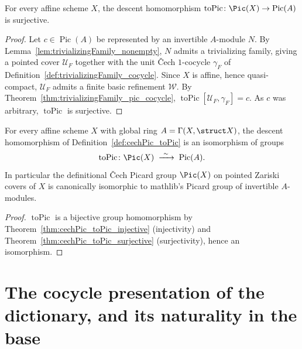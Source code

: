 \begin{theorem}
  \label{thm:cechPic_toPic_surjective}
  \leanok
  For every affine scheme \(X\), the descent homomorphism \(\operatorname{toPic} \colon
  \Pic(X) \to \operatorname{Pic}(A)\) is surjective.
\end{theorem}
\begin{proof}
  \leanok
  Let \(c \in \operatorname{Pic}(A)\) be represented by an invertible \(A\)-module \(N\). By
  Lemma~\ref{lem:trivializingFamily_nonempty}, \(N\) admits a trivializing family, giving a
  pointed cover \(\mathcal U_F\) together with the unit \v Cech \(1\)-cocycle \(\gamma_F\) of
  Definition~\ref{def:trivializingFamily_cocycle}. Since \(X\) is affine, hence quasi-compact,
  \(\mathcal U_F\) admits a finite basic refinement \(\mathcal W\). By
  Theorem~\ref{thm:trivializingFamily_pic_cocycle}, \(\operatorname{toPic}[\mathcal
  U_F,\gamma_F] = c\). As \(c\) was arbitrary, \(\operatorname{toPic}\) is surjective.
\end{proof}

\begin{theorem}
  \label{thm:cechPicEquivPic}
  \leanok
  For every affine scheme \(X\) with global ring \(A = \Gamma(X,\struct X)\), the descent
  homomorphism of Definition~\ref{def:cechPic_toPic} is an isomorphism of groups
  \[
    \operatorname{toPic} \colon \Pic(X) \;\xrightarrow{\ \sim\ }\; \operatorname{Pic}(A).
  \]
  In particular the definitional \v Cech Picard group \(\Pic(X)\) on pointed Zariski covers of
  \(X\) is canonically isomorphic to mathlib's Picard group of invertible \(A\)-modules.
\end{theorem}
\begin{proof}
  \leanok
  \(\operatorname{toPic}\) is a bijective group homomorphism by
  Theorem~\ref{thm:cechPic_toPic_injective} (injectivity) and
  Theorem~\ref{thm:cechPic_toPic_surjective} (surjectivity), hence an isomorphism.
\end{proof}

\section{The cocycle presentation of the dictionary, and its naturality in the base}

